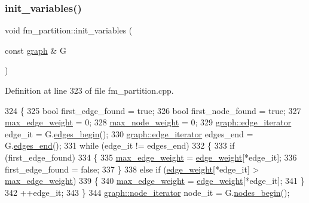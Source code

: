 \subsubsection{\texorpdfstring{init\+\_\+variables()}{init\_variables()}}
{\footnotesize\ttfamily void fm\+\_\+partition\+::init\+\_\+variables (\begin{DoxyParamCaption}\item[{const \mbox{\hyperlink{classgraph}{graph}} \&}]{G }\end{DoxyParamCaption})\hspace{0.3cm}{\ttfamily [protected]}}



Definition at line 323 of file fm\+\_\+partition.\+cpp.


\begin{DoxyCode}
324 \{
325     \textcolor{keywordtype}{bool} first\_edge\_found = \textcolor{keyword}{true};
326     \textcolor{keywordtype}{bool} first\_node\_found = \textcolor{keyword}{true};
327     \mbox{\hyperlink{classfm__partition_a5b37b4ac8d96236f274a57a46d653e25}{max\_edge\_weight}} = 0;
328     \mbox{\hyperlink{classfm__partition_a8591f5eddac01679e1da3d835eae1cf6}{max\_node\_weight}} = 0;
329     \mbox{\hyperlink{classgraph_a818d3766018eb0af91d520ce2150203c}{graph::edge\_iterator}} edge\_it = G.\mbox{\hyperlink{classgraph_a7ba35a4c4e8343ffb27ed6d9703c6f18}{edges\_begin}}();
330     \mbox{\hyperlink{classgraph_a818d3766018eb0af91d520ce2150203c}{graph::edge\_iterator}} edges\_end = G.\mbox{\hyperlink{classgraph_aea8d7f976b85b6137f52d915e26639f6}{edges\_end}}();
331     \textcolor{keywordflow}{while} (edge\_it != edges\_end)
332     \{
333     \textcolor{keywordflow}{if} (first\_edge\_found)
334     \{
335         \mbox{\hyperlink{classfm__partition_a5b37b4ac8d96236f274a57a46d653e25}{max\_edge\_weight}} = \mbox{\hyperlink{classfm__partition_adfe6147ba3f9c785f613b472f950595f}{edge\_weight}}[*edge\_it];
336         first\_edge\_found = \textcolor{keyword}{false};
337     \}
338     \textcolor{keywordflow}{else} \textcolor{keywordflow}{if} (\mbox{\hyperlink{classfm__partition_adfe6147ba3f9c785f613b472f950595f}{edge\_weight}}[*edge\_it] > \mbox{\hyperlink{classfm__partition_a5b37b4ac8d96236f274a57a46d653e25}{max\_edge\_weight}})
339     \{
340         \mbox{\hyperlink{classfm__partition_a5b37b4ac8d96236f274a57a46d653e25}{max\_edge\_weight}} = \mbox{\hyperlink{classfm__partition_adfe6147ba3f9c785f613b472f950595f}{edge\_weight}}[*edge\_it];
341     \}
342     ++edge\_it;
343     \}
344     \mbox{\hyperlink{classgraph_a2cb374b84c133ce13f94e73c3e5da7fa}{graph::node\_iterator}} node\_it = G.\mbox{\hyperlink{classgraph_aec053a4b509d1be804237a80044c54c0}{nodes\_begin}}();

\end{DoxyCode}
